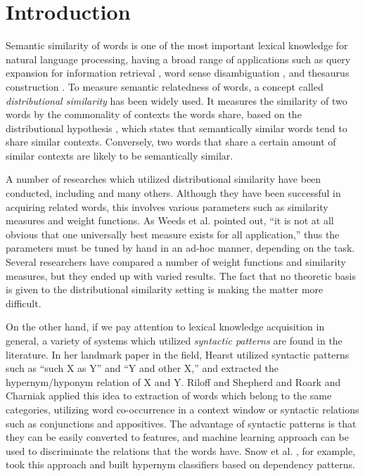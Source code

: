 \documentclass[english]{jnlp_1.4}
\begin{document}
\maketitle


\section{Introduction}


Semantic similarity of words is one of the most important lexical
knowledge for natural language processing, having a broad range of
applications such as query expansion for information retrieval
\cite{Crouch:92,Jing:94}, word sense disambiguation \cite{Ng:96}, and
thesaurus construction \cite{Kojima:95,Grefenstette:94}. To measure
semantic relatedness of words, a concept called \textit{distributional
similarity} has been widely used. It measures the similarity of two
words by the commonality of contexts the words share, based on the
distributional hypothesis \cite{Harris:85}, which states that
semantically similar words tend to share similar contexts. Conversely,
two words that share a certain amount of similar contexts are likely
to be semantically similar.

A number of researches which utilized distributional similarity have
been conducted, including \cite{Hindle:90,Lin:98:automatic,Geffet:04}
and many others. Although they have been successful in acquiring
related words, this involves various parameters such as similarity
measures and weight functions. As Weeds et al. \cite{Weeds:04} pointed
out, ``it is not at all obvious that one universally best measure
exists for all application,'' thus the parameters must be tuned by
hand in an ad-hoc manner, depending on the task. Several researchers
\cite{Lee:99,Curran:02:improvements,Weeds:04} have compared a number
of weight functions and similarity measures, but they ended up with
varied results. The fact that no theoretic basis is given to the
distributional similarity setting is making the matter more difficult.

On the other hand, if we pay attention to lexical knowledge
acquisition in general, a variety of systems which utilized {\em
syntactic patterns} are found in the literature. In her landmark paper
in the field, Hearst \cite{Hearst:92} utilized syntactic patterns such
as ``such X as Y'' and ``Y and other X,'' and extracted the
hypernym/hyponym relation of X and Y. Riloff and Shepherd
\cite{Riloff:97} and Roark and Charniak \cite{Roark:98} applied this
idea to extraction of words which belong to the same categories,
utilizing word co-occurrence in a context window or syntactic
relations such as conjunctions and appositives. The advantage of
syntactic patterns is that they can be easily converted to features,
and machine learning approach can be used to discriminate the
relations that the words have. Snow et al. \cite{Snow:04}, for
example, took this approach and built hypernym classifiers based on
dependency patterns.
\end{document}
